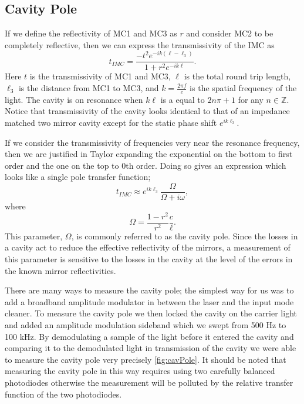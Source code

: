\documentclass[10pt]{article}
\begin{document}
\subsection{Cavity Pole}
If we define the reflectivity of MC1 and MC3 as $r$ and consider MC2 to be completely reflective, 
then we can express the transmissivity of the IMC as
\begin{equation}
	t_{IMC}=\frac{-t^2e^{-ik(\ell-\ell_3)}}{1+r^2e^{-ik\ell}}.
\end{equation}
Here $t$ is the transmissivity of MC1 and MC3, $\ell$ is the total round trip length, 
$\ell_3$ is the distance from MC1 to MC3, and $k=\tfrac{2\pi f}{c}$ is the spatial frequency 
of the light.  
The cavity is on resonance when $k\ell$ is a equal to $2n\pi+1$ for any $n\in\mathbb{Z}$.  
Notice that transmissivity of the cavity looks identical to that of an impedance matched 
two mirror cavity except for the static phase shift $e^{ik\ell_3}$.  

If we consider the transmissivity of frequencies very near the resonance frequency, 
then we are justified in Taylor expanding the exponential on the bottom to first order 
and the one on the top to 0th order.
Doing so gives an expression which looks like a single pole transfer function;
\begin{equation}
	t_{IMC}\approx e^{ik\ell_3}\frac{\Omega}{\Omega+i\omega},
	\label{eq:PoleApx}
\end{equation}
where
\begin{equation}
	\Omega=\frac{1-r^2}{r^2}\frac{c}{\ell}.
\end{equation}
This parameter, $\Omega$, is commonly referred to as the cavity pole.  
Since the losses in a cavity act to reduce the effective reflectivity of the mirrors, 
a measurement of this parameter is sensitive to the losses in the cavity at the level 
of the errors in the known mirror reflectivities.

There are many ways to measure the cavity pole; 
the simplest way for us was to add a broadband amplitude modulator in between the laser 
and the input mode cleaner.  
To measure the cavity pole we then locked the cavity on the carrier light and added 
an amplitude modulation sideband which we swept from 500 Hz to 100 kHz.  
By demodulating a sample of the light before it entered the cavity and comparing 
it to the demodulated light in transmission of the cavity we were able to 
measure the cavity pole very precisely \ref{fig:cavPole}.  
It should be noted that measuring the cavity pole in this way requires using two 
carefully balanced photodiodes otherwise the measurement will be polluted by the 
relative transfer function of the two photodiodes.
\end{document}
